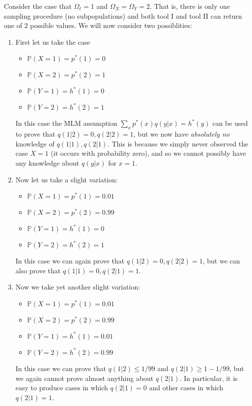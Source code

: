 Consider the case that $\Omega_\ell = 1$ and $\Omega_X=\Omega_Y=2$.  That is, there is only one sampling procedure (no subpopulations) and both tool I and tool II can return one of $2$ possible values.  We will now consider two possiblities:
\begin{enumerate}
\item First let us take the case
    \begin{itemize}
    \item $\mathbb{P}(X=1)=p^*(1)=0$
    \item $\mathbb{P}(X=2)=p^*(2)=1$
    \item $\mathbb{P}(Y=1)=h^*(1)=0$
    \item $\mathbb{P}(Y=2)=h^*(2)=1$
    \end{itemize}
    In this case the MLM assumption $\sum_x p^*(x)q(y|x)=h^*(y)$ can be used to prove that $q(1|2)=0,q(2|2)=1$, but we now have \emph{absolutely no} knowledge of $q(1|1),q(2|1)$.  This is because we simply never observed the case $X=1$ (it occurs with probability zero), and so we cannot possibly have any knowledge about $q(y|x)$ for $x=1$.  
\item Now let us take a slight variation:
    \begin{itemize}
    \item $\mathbb{P}(X=1)=p^*(1)=0.01$
    \item $\mathbb{P}(X=2)=p^*(2)=0.99$
    \item $\mathbb{P}(Y=1)=h^*(1)=0$
    \item $\mathbb{P}(Y=2)=h^*(2)=1$
    \end{itemize}
    In this case we can again prove that $q(1|2)=0,q(2|2)=1$, but we can also prove that $q(1|1)=0,q(2|1)=1$.  
\item Now we take yet another slight variation:
    \begin{itemize}
    \item $\mathbb{P}(X=1)=p^*(1)=0.01$
    \item $\mathbb{P}(X=2)=p^*(2)=0.99$
    \item $\mathbb{P}(Y=1)=h^*(1)=0.01$
    \item $\mathbb{P}(Y=2)=h^*(2)=0.99$
    \end{itemize}
    In this case we can prove that $q(1|2)\leq 1/99$ and $q(2|1)\geq 1-1/99$, but we again cannot prove almost anything about $q(2|1)$.  In particular, it is easy to produce cases in which $q(2|1)=0$ and other cases in which $q(2|1)=1$.  

\end{enumerate}

